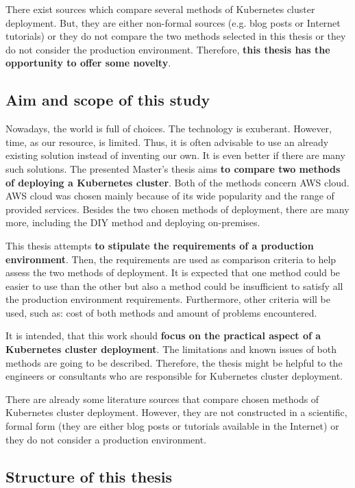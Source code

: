 There exist sources which compare several methods of Kubernetes cluster deployment. But, they are either non-formal sources (e.g. blog posts or Internet tutorials) or they do not compare the two methods selected in this thesis or they do not consider the production environment. Therefore, \textbf{this thesis has the opportunity to offer some novelty}.

\subsection{Aim and scope of this study}


Nowadays, the world is full of choices. The technology is exuberant. However, time, as our resource, is limited. Thus, it is often advisable to use an already existing solution instead of inventing our own. It is even better if there are many such solutions. The presented Master's thesis aims \textbf{to compare two methods of deploying a Kubernetes cluster}. Both of the methods concern AWS cloud. AWS cloud was chosen mainly because of its wide popularity and the range of provided services. Besides the two chosen methods of deployment, there are many more, including the DIY method and deploying on-premises.

This thesis attempts \textbf{to stipulate the requirements of a production environment}. Then, the requirements are used as comparison criteria to help assess the two methods of deployment. It is expected that one method could be easier to use than the other but also a method could be insufficient to satisfy all the production environment requirements. Furthermore, other criteria will be used, such as: cost of both methods and amount of problems encountered.

It is intended, that this work should \textbf{focus on the practical aspect of a Kubernetes cluster deployment}. The limitations and known issues of both methods are going to be described. Therefore, the thesis might be helpful to the engineers or consultants who are responsible for Kubernetes cluster deployment.

There are already some literature sources that compare chosen methods of Kubernetes cluster deployment. However, they are not constructed in a scientific, formal form (they are either blog posts or tutorials available in the Internet) or they do not consider a production environment.

\subsection{Structure of this thesis}

